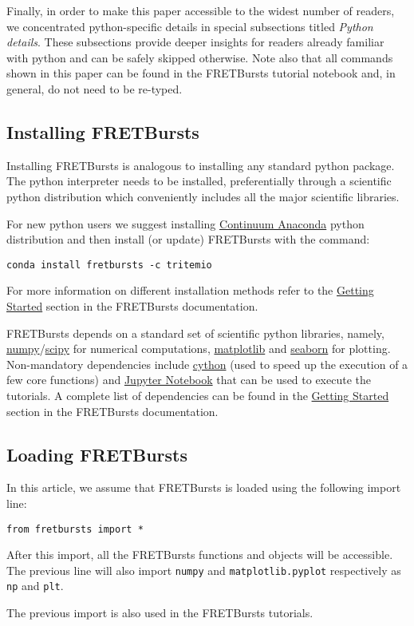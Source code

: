 Finally, in order to make this paper accessible to the widest number of readers,
we concentrated python-specific details in special subsections titled 
\textit{Python details}. These subsections provide deeper insights for readers
already familiar with python and can be safely skipped otherwise. Note also
that all commands shown in this paper can be found in the FRETBursts tutorial notebook
and, in general, do not need to be re-typed.

\subsection{Installing FRETBursts}
\label{sec:install}
Installing FRETBursts is analogous to installing any standard python
package. The python interpreter needs to be installed, preferentially
through a scientific python distribution which conveniently includes 
all the major scientific libraries.

For new python users we suggest installing 
\href{https://store.continuum.io/cshop/anaconda/}{Continuum Anaconda}
python distribution and then install (or update) FRETBursts with the command:

\begin{verbatim}
conda install fretbursts -c tritemio
\end{verbatim}

For more information on different installation methods refer to the 
\href{http://fretbursts.readthedocs.org/en/latest/getting_started.html}{Getting Started}
section in the FRETBursts documentation.

FRETBursts depends on a standard set of scientific 
python libraries, namely, \href{http://www.numpy.org/}{numpy}/\href{http://www.scipy.org/}{scipy} for numerical computations, 
\href{http://matplotlib.org/}{matplotlib} and \href{http://stanford.edu/~mwaskom/software/seaborn/}{seaborn} for plotting. Non-mandatory dependencies include \href{http://cython.org/}{cython} (used to speed up the execution of a few core functions)
and \href{http://ipython.org/notebook.html}{Jupyter Notebook} that can be used
to execute the tutorials.
A complete list of dependencies can be found in the 
\href{http://fretbursts.readthedocs.org/en/latest/getting_started.html}{Getting Started}
section in the FRETBursts documentation.

\subsection{Loading FRETBursts}
\label{sec:import}
In this article, we assume that FRETBursts is loaded using the following 
import line:

\begin{verbatim}
from fretbursts import *
\end{verbatim}

After this import, all the FRETBursts functions and objects will be accessible.
The previous line will also import \verb|numpy| and \verb|matplotlib.pyplot|
respectively as \verb|np| and \verb|plt|.

The previous import is also used in the FRETBursts tutorials.